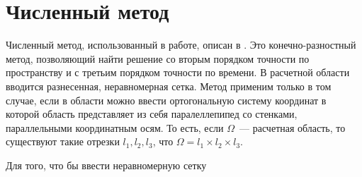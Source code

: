 \section*{Численный метод}

Численный метод, использованный в работе, описан в \cite{method}. Это конечно-разностный метод, позволяющий найти решение со вторым порядком точности по пространству и с третьим порядком точности по времени. В расчетной области вводится разнесенная, неравномерная сетка. Метод применим только в том случае, если в области можно ввести ортогональную систему координат в которой область представляет из себя паралеллепипед со стенками, параллельными координатным осям. То есть, если $\Omega$~--- расчетная область, то существуют такие отрезки $l_1, l_2, l_3$, что $\Omega = l_1 \times l_2 \times l_3$. 

Для того, что бы ввести неравномерную сетку